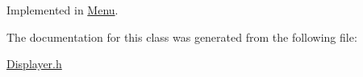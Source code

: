 Implemented in \hyperlink{class_menu_ab19f32f8deac0f6c6960f04be8612067}{Menu}.



The documentation for this class was generated from the following file\+:\begin{DoxyCompactItemize}
\item 
\hyperlink{_displayer_8h}{Displayer.\+h}\end{DoxyCompactItemize}
